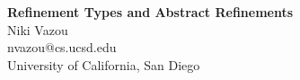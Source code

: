 \documentclass[runningheads,a4paper]{article}
\makeatletter
\newcommand{\at}{\makeatletter @\makeatother}
\newcommand\mytitle{Refinement Types and Abstract Refinements}
\newcommand\myauthor{Niki Vazou}
\newcommand\institution{University of California, San Diego}
\newcommand\myemail{nvazou\at cs.ucsd.edu}
\newcommand{\mymaketitle}{
  \begin{center}
  	{\LARGE\bf \mytitle \\ \vspace{1cm}}%
    {\Large \myauthor \\}%
 	{\large \myemail \\}%
  	{\large \institution \\}%
  \end{center}
  \par}
\makeatother
\begin{document}
\mymaketitle
\begin{abstract}

\end{abstract}








{


}
\end{document}
